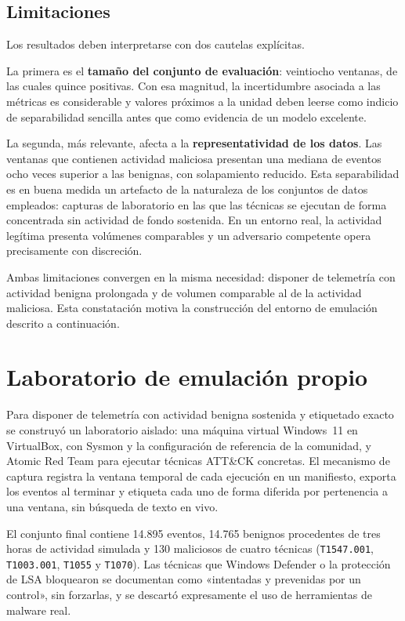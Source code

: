 \subsection{Limitaciones}

Los resultados deben interpretarse con dos cautelas explícitas.

La primera es el \textbf{tamaño del conjunto de evaluación}: veintiocho ventanas, de las cuales
quince positivas. Con esa magnitud, la incertidumbre asociada a las métricas es
considerable y valores próximos a la unidad deben leerse como indicio de separabilidad
sencilla antes que como evidencia de un modelo excelente.

La segunda, más relevante, afecta a la \textbf{representatividad de los datos}. Las ventanas
que contienen actividad maliciosa presentan una mediana de eventos ocho veces superior a las
benignas, con solapamiento reducido. Esta separabilidad es en buena medida un artefacto de la
naturaleza de los conjuntos de datos empleados: capturas de laboratorio en las que las
técnicas se ejecutan de forma concentrada sin actividad de fondo sostenida. En un entorno
real, la actividad legítima presenta volúmenes comparables y un adversario competente opera
precisamente con discreción.

Ambas limitaciones convergen en la misma necesidad: disponer de telemetría con actividad
benigna prolongada y de volumen comparable al de la actividad maliciosa. Esta constatación
motiva la construcción del entorno de emulación descrito a continuación.

\section{Laboratorio de emulación propio}
\label{sec:laboratorio}

Para disponer de telemetría con actividad benigna sostenida y etiquetado exacto se construyó
un laboratorio aislado: una máquina virtual Windows~11 en VirtualBox, con Sysmon y la
configuración de referencia de la comunidad, y Atomic Red Team para ejecutar técnicas
ATT\&CK concretas. El mecanismo de captura registra la ventana temporal de cada ejecución en
un manifiesto, exporta los eventos al terminar y etiqueta cada uno de forma diferida por
pertenencia a una ventana, sin búsqueda de texto en vivo.

El conjunto final contiene 14.895 eventos, 14.765 benignos procedentes de tres horas de
actividad simulada y 130 maliciosos de cuatro técnicas (\texttt{T1547.001},
\texttt{T1003.001}, \texttt{T1055} y \texttt{T1070}). Las técnicas que Windows Defender o la
protección de LSA bloquearon se documentan como «intentadas y prevenidas por un control», sin
forzarlas, y se descartó expresamente el uso de herramientas de malware real.


